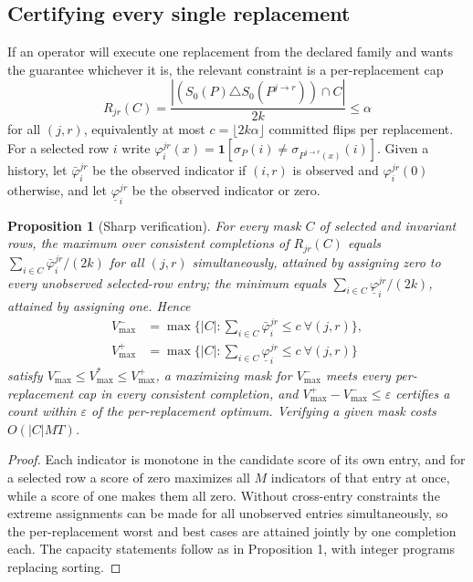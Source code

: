 \documentclass[11pt]{article}
\newtheorem{proposition}{Proposition}
\newcommand{\Sz}{S_0}
\newcommand{\ind}{\mathbf{1}}
\begin{document}
\subsection{Certifying every single replacement}
\label{app:caps}
If an operator will execute one replacement from the declared family and wants the guarantee whichever it is, the relevant constraint is a per-replacement cap
\[
R_{jr}(C)=\frac{|(\Sz(P)\triangle\Sz(P^{j\to r}))\cap C|}{2k}\le\alpha
\]
for all $(j,r)$,
equivalently at most $c=\lfloor 2k\alpha\rfloor$ committed flips per replacement. For a selected row $i$ write $\varphi_i^{jr}(x)=\ind[\sigma_P(i)\neq\sigma_{P^{j\to r}(x)}(i)]$. Given a history, let $\bar\varphi_i^{jr}$ be the observed indicator if $(i,r)$ is observed and $\varphi_i^{jr}(0)$ otherwise, and let $\underline\varphi_i^{jr}$ be the observed indicator or zero.

\begin{proposition}[Sharp verification]
\label{prop:capverify}
For every mask $C$ of selected and invariant rows, the maximum over consistent completions of $R_{jr}(C)$ equals $\sum_{i\in C}\bar\varphi_i^{jr}/(2k)$ for all $(j,r)$ simultaneously, attained by assigning zero to every unobserved selected-row entry; the minimum equals $\sum_{i\in C}\underline\varphi_i^{jr}/(2k)$, attained by assigning one. Hence
\begin{align*}
V^-_{\max}&=\max\Big\{|C|:\textstyle\sum_{i\in C}\bar\varphi_i^{jr}\le c\ \forall (j,r)\Big\},\\
V^+_{\max}&=\max\Big\{|C|:\textstyle\sum_{i\in C}\underline\varphi_i^{jr}\le c\ \forall (j,r)\Big\}
\end{align*}
satisfy $V^-_{\max}\le V^*_{\max}\le V^+_{\max}$, a maximizing mask for $V^-_{\max}$ meets every per-replacement cap in every consistent completion, and $V^+_{\max}-V^-_{\max}\le\varepsilon$ certifies a count within $\varepsilon$ of the per-replacement optimum. Verifying a given mask costs $O(|C|MT)$.
\end{proposition}
\begin{proof}
Each indicator is monotone in the candidate score of its own entry, and for a selected row a score of zero maximizes all $M$ indicators of that entry at once, while a score of one makes them all zero. Without cross-entry constraints the extreme assignments can be made for all unobserved entries simultaneously, so the per-replacement worst and best cases are attained jointly by one completion each. The capacity statements follow as in Proposition 1, with integer programs replacing sorting.
\end{proof}
\end{document}
